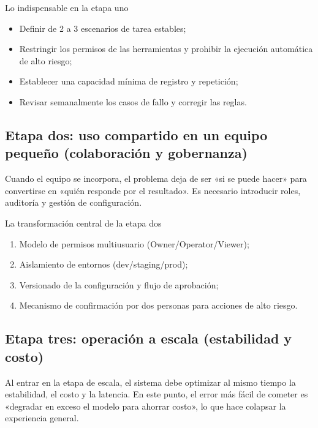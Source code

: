 \documentclass[a4paper]{article}
\begin{document}
\begin{knowledgebox}{Lo indispensable en la etapa uno}
\begin{itemize}
    \item Definir de 2 a 3 escenarios de tarea estables;
    \item Restringir los permisos de las herramientas y prohibir la ejecución automática de alto riesgo;
    \item Establecer una capacidad mínima de registro y repetición;
    \item Revisar semanalmente los casos de fallo y corregir las reglas.
\end{itemize}
\end{knowledgebox}

\subsection{Etapa dos: uso compartido en un equipo pequeño (colaboración y gobernanza)}

Cuando el equipo se incorpora, el problema deja de ser «si se puede hacer» para convertirse en «quién responde por el resultado». Es necesario introducir roles, auditoría y gestión de configuración.

\begin{importantbox}{La transformación central de la etapa dos}
\begin{enumerate}
    \item Modelo de permisos multiusuario (Owner/Operator/Viewer);
    \item Aislamiento de entornos (dev/staging/prod);
    \item Versionado de la configuración y flujo de aprobación;
    \item Mecanismo de confirmación por dos personas para acciones de alto riesgo.
\end{enumerate}
\end{importantbox}

\subsection{Etapa tres: operación a escala (estabilidad y costo)}

Al entrar en la etapa de escala, el sistema debe optimizar al mismo tiempo la estabilidad, el costo y la latencia. En este punto, el error más fácil de cometer es «degradar en exceso el modelo para ahorrar costo», lo que hace colapsar la experiencia general.
\end{document}
